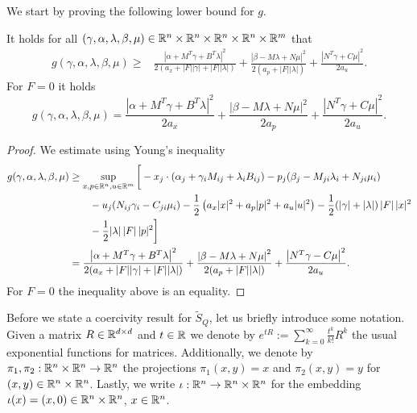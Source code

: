 \documentclass[11pt]{article}
\begin{document}
We start by proving the following lower bound for $g$.

\begin{proposition}\label{prop: lb g}
    It holds for all $(\gamma,\alpha,\lambda,\beta,\mu) \in \mathbb R^n \times \mathbb R^n \times \mathbb R^n \times \mathbb R^n \times \mathbb R^m$ that
    \begin{align*}
    g(\gamma,\alpha,\lambda,\beta,\mu) \geq &\frac{\left| \alpha + M^T \gamma + B^T \lambda \right|^2}{2 (a_x + |F| |\gamma| + |F| |\lambda|)}  + \frac{\left| \beta - M \lambda + N \mu \right|^2}{2 ( a_p + |F| |\lambda|)}  + \frac{\left| N^T \gamma + C \mu \right|^2}{2a_u} .
    \end{align*}
    For $F = 0$ it holds 
    \[
        g(\gamma,\alpha,\lambda,\beta,\mu) = \frac{\left| \alpha + M^T \gamma + B^T \lambda \right|^2}{2 a_x}  + \frac{\left| \beta - M \lambda + N \mu \right|^2}{2  a_p }  + \frac{\left| N^T \gamma + C \mu \right|^2}{2a_u} .
    \]
\end{proposition}
\begin{proof}
    We estimate using Young's inequality
    \begin{align*}
    g(\gamma,\alpha,\lambda,\beta,\mu) &\geq \sup_{x,p \in\mathbb R^n, u \in \mathbb R^m} \bigg[-x_j \cdot ( \alpha_j + \gamma_i M_{ij} + \lambda_i B_{ij} ) - p_j ( \beta_j -  M_{ji} \lambda_i + N_{ji} \mu_i ) \\ & \qquad - u_j ( N_{ij} \gamma_i - C_{ji} \mu_i)   - \frac12\left( a_x |x |^2 + a_p |p|^2 + a_u |u|^2 \right) - \frac12 (|\gamma| + |\lambda|) \, |F| \, |x|^2 \\ & \qquad -  \frac12 |\lambda| \, |F| \, |p|^2 \bigg] \\
    &= \frac{\left| \alpha + M^T \gamma + B^T \lambda \right|^2}{2 (a_x + |F| |\gamma| + |F| |\lambda|)}  + \frac{\left| \beta - M \lambda + N \mu \right|^2}{2 ( a_p + |F| |\lambda|)}  + \frac{\left| N^T \gamma - C \mu \right|^2}{2a_u} .
\end{align*}
For $F =0$ the inequality above is an equality.
\end{proof}

Before we state a coercivity result for $\tilde{S}_Q$, let us briefly introduce some notation.
Given a matrix $R \in \mathbb R^{d\times d}$ and $t \in \mathbb R$ we denote by $e^{tR} := \sum_{k=0}^{\infty} \frac{t^k}{k!} R^k$ the usual exponential functions for matrices. 
Additionally, we denote by $\pi_1,\pi_2: \mathbb R^{n} \times \mathbb R^{n} \to \mathbb R^n$ the projections $\pi_1(x,y) = x$ and $\pi_2(x,y) = y$ for $(x,y) \in \mathbb R^n \times \mathbb R^n$. 
Lastly, we write $\iota: \mathbb R^n \to \mathbb R^{n} \times \mathbb R^n$ for the embedding $\iota(x) = (x,0) \in \mathbb R^n \times \mathbb R^n$, $x\in \mathbb R^n$.
\end{document}
